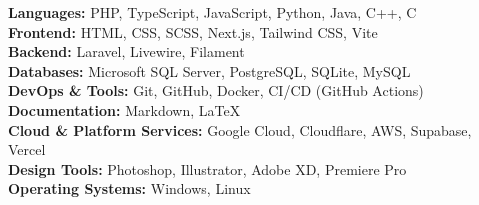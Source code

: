 \newcommand{\skilltag}[2]{\textbf{#1:} #2}

\skilltag{Languages}{PHP, TypeScript, JavaScript, Python, Java, C++, C}\\[0.5em]
\skilltag{Frontend}{HTML, CSS, SCSS, Next.js, Tailwind CSS, Vite}\\[0.5em]
\skilltag{Backend}{Laravel, Livewire, Filament}\\[0.5em]
\skilltag{Databases}{Microsoft SQL Server, PostgreSQL, SQLite, MySQL}\\[0.5em]
\skilltag{DevOps \& Tools}{Git, GitHub, Docker, CI/CD (GitHub Actions)}\\[0.5em]
\skilltag{Documentation}{Markdown, LaTeX}\\[0.5em]
\skilltag{Cloud \& Platform Services}{Google Cloud, Cloudflare, AWS, Supabase, Vercel}\\[0.5em]
\skilltag{Design Tools}{Photoshop, Illustrator, Adobe XD, Premiere Pro}\\[0.5em]
\skilltag{Operating Systems}{Windows, Linux}\\[0.5em]

\vspace{4mm}